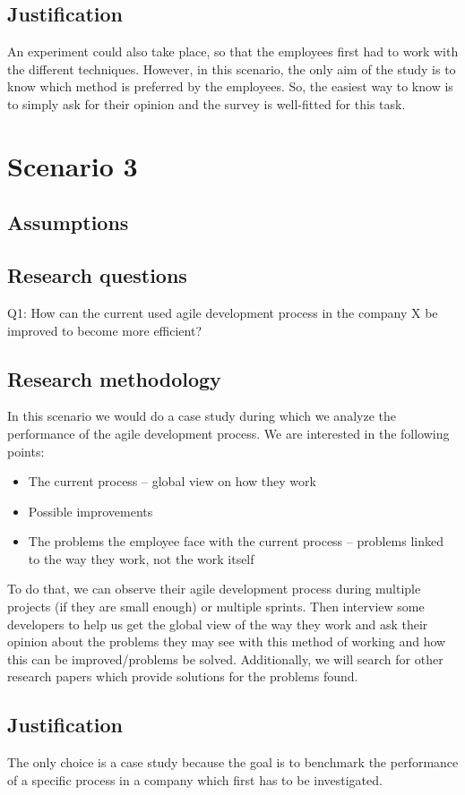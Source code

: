 \documentclass{article}
\begin{document}
\subsection{Justification}
An experiment could also take place, so that the employees first had to work with the different techniques. However, in this scenario, the only aim of the study is to know which method is preferred by the employees. So, the easiest way to know is to simply ask for their opinion and the survey is well-fitted for this task. 


\section{Scenario 3}
\subsection{Assumptions}

\subsection{Research questions}
Q1: How can the current used agile development process in the company X be improved to become more efficient?

\subsection{Research methodology}
In this scenario we would do a case study during which we analyze the performance of the agile development process. We are interested in the following points:
\begin{itemize}
    \item The current process – global view on how they work
    \item Possible improvements
    \item The problems the employee face with the current process – problems linked to the way they work, not the work itself
\end{itemize}
To do that, we can observe their agile development process during multiple projects (if they are small enough) or multiple sprints. Then interview some developers to help us get the global view of the way they work and ask their opinion about the problems they may see with this method of working and how this can be improved/problems be solved. Additionally, we will search for other research papers which provide solutions for the problems found.

\subsection{Justification}
The only choice is a case study because the goal is to benchmark the performance of a specific process in a company which first has to be investigated.
\end{document}
